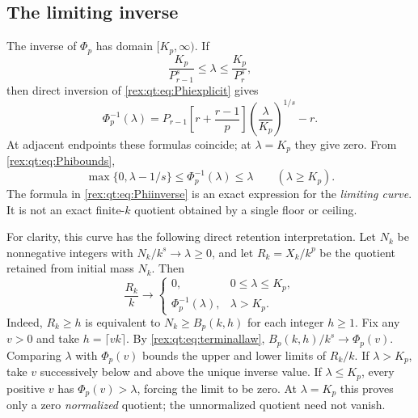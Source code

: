 \subsection{The limiting inverse}
The inverse of $\Phi_p$ has domain $[K_p,\infty)$. If
\begin{equation}\label{rex:qt:eq:inversecells}
 \frac{K_p}{P_{r-1}^s}\le\lambda\le\frac{K_p}{P_r^s},
\end{equation}
then direct inversion of \eqref{rex:qt:eq:Phiexplicit} gives
\begin{equation}\label{rex:qt:eq:Phiinverse}
 \Phi_p^{-1}(\lambda)=P_{r-1}\left[r+\frac{r-1}{p}\right]
                 \left(\frac\lambda{K_p}\right)^{1/s}-r.
\end{equation}
At adjacent endpoints these formulas coincide; at $\lambda=K_p$ they give zero. From \eqref{rex:qt:eq:Phibounds},
\[
 \max\{0,\lambda-1/s\}\le\Phi_p^{-1}(\lambda)\le\lambda
                  \qquad(\lambda\ge K_p).
\]
The formula in \eqref{rex:qt:eq:Phiinverse} is an exact expression for the \emph{limiting curve}. It is not an exact finite-$k$ quotient obtained by a single floor or ceiling.

For clarity, this curve has the following direct retention interpretation. Let $N_k$ be nonnegative integers with $N_k/k^s\to\lambda\ge0$, and let $R_k=X_k/k^p$ be the quotient retained from initial mass $N_k$. Then
\begin{equation}\label{rex:qt:eq:retentionlimit}
 \frac{R_k}{k}\longrightarrow
 \begin{cases}
 0,&0\le\lambda\le K_p,\\
 \Phi_p^{-1}(\lambda),&\lambda>K_p.
 \end{cases}
\end{equation}
Indeed, $R_k\ge h$ is equivalent to $N_k\ge B_p(k,h)$ for each integer $h\ge1$. Fix any $v>0$ and take $h=\lceil vk\rceil$. By \eqref{rex:qt:eq:terminallaw}, $B_p(k,h)/k^s\to\Phi_p(v)$. Comparing $\lambda$ with $\Phi_p(v)$ bounds the upper and lower limits of $R_k/k$. If $\lambda>K_p$, take $v$ successively below and above the unique inverse value. If $\lambda\le K_p$, every positive $v$ has $\Phi_p(v)>\lambda$, forcing the limit to be zero. At $\lambda=K_p$ this proves only a zero \emph{normalized} quotient; the unnormalized quotient need not vanish.

